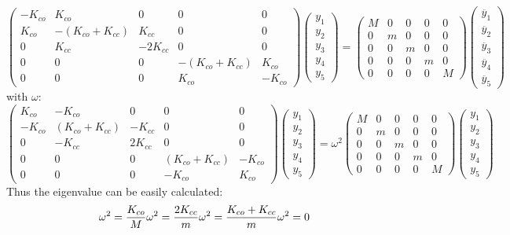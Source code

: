 \documentclass[11pt,letterpaper]{article}
\begin{document}
$$
\begin{pmatrix}
 -K_{co} & K_{co} & 0 & 0 & 0 \\
 K_{co} & -(K_{co}+K_{cc}) & K_{cc} & 0 & 0 \\
 0 & K_{cc} & -2K_{cc} & 0 & 0 \\
 0 & 0 & 0 & -(K_{co}+K_{cc}) & K_{co} \\
 0 & 0 & 0 & K_{co} & -K_{co} 
\end{pmatrix}
\begin{pmatrix}
 y_1\\
 y_2\\
 y_3\\
 y_4\\
 y_5
\end{pmatrix}
=
\begin{pmatrix}
 M & 0 & 0 & 0 & 0\\
 0 & m & 0 & 0 & 0\\
 0 & 0 & m & 0 & 0\\
 0 & 0 & 0 & m & 0\\
 0 & 0 & 0 & 0 & M
\end{pmatrix}
\begin{pmatrix}
 \ddot{y_1}\\
 \ddot{y_2}\\
 \ddot{y_3}\\
 \ddot{y_4}\\
 \ddot{y_5}
\end{pmatrix}
$$
with $\omega$:
$$
\begin{pmatrix}
 K_{co} & -K_{co} & 0 & 0 & 0 \\
 -K_{co} & (K_{co}+K_{cc}) & -K_{cc} & 0 & 0 \\
 0 & -K_{cc} & 2K_{cc} & 0 & 0 \\
 0 & 0 & 0 & (K_{co}+K_{cc}) & -K_{co} \\
 0 & 0 & 0 & -K_{co} & K_{co} 
\end{pmatrix}
\begin{pmatrix}
 y_1\\
 y_2\\
 y_3\\
 y_4\\
 y_5
\end{pmatrix}
=\omega^2
\begin{pmatrix}
 M & 0 & 0 & 0 & 0\\
 0 & m & 0 & 0 & 0\\
 0 & 0 & m & 0 & 0\\
 0 & 0 & 0 & m & 0\\
 0 & 0 & 0 & 0 & M
\end{pmatrix}
\begin{pmatrix}
 y_1\\
 y_2\\
 y_3\\
 y_4\\
 y_5
\end{pmatrix}
$$
Thus the eigenvalue can be easily calculated:
$$
\omega^2=\frac{K_{co}}{M}\\
\omega^2=\frac{2K_{cc}}{m}\\
\omega^2=\frac{K_{co}+K_{cc}}{m}\\
\omega^2=0
$$
\end{document}

